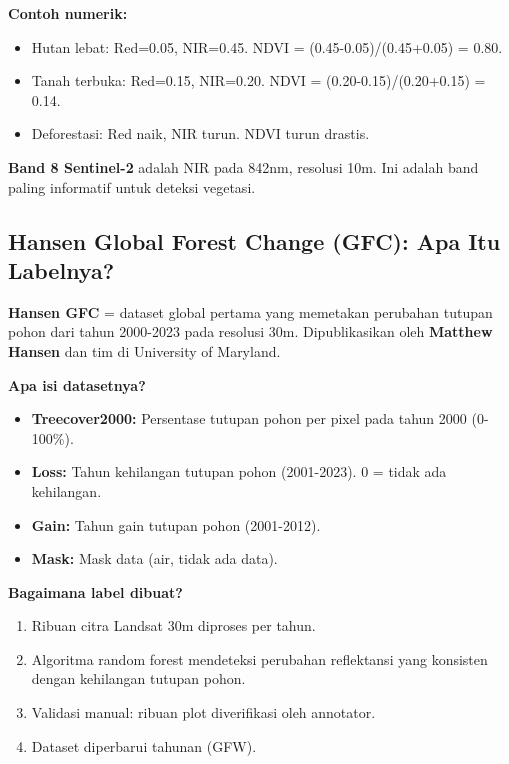 \documentclass[10pt,a4paper,onecolumn]{article}
\begin{document}
\textbf{Contoh numerik:}
\begin{itemize}[nosep]
    \item Hutan lebat: Red=0.05, NIR=0.45. NDVI = (0.45-0.05)/(0.45+0.05) = 0.80.
    \item Tanah terbuka: Red=0.15, NIR=0.20. NDVI = (0.20-0.15)/(0.20+0.15) = 0.14.
    \item Deforestasi: Red naik, NIR turun. NDVI turun drastis.
\end{itemize}

\textbf{Band 8 Sentinel-2} adalah NIR pada 842nm, resolusi 10m.
Ini adalah band paling informatif untuk deteksi vegetasi.

\subsection{Hansen Global Forest Change (GFC): Apa Itu Labelnya?}

\textbf{Hansen GFC} \cite{hansen2013high} = dataset global pertama
yang memetakan perubahan tutupan pohon dari tahun 2000-2023 pada
resolusi 30m. Dipublikasikan oleh \textbf{Matthew Hansen} dan tim
di University of Maryland.

\textbf{Apa isi datasetnya?}
\begin{itemize}[nosep]
    \item \textbf{Treecover2000:} Persentase tutupan pohon per pixel
          pada tahun 2000 (0-100\%).
    \item \textbf{Loss:} Tahun kehilangan tutupan pohon (2001-2023).
          0 = tidak ada kehilangan.
    \item \textbf{Gain:} Tahun gain tutupan pohon (2001-2012).
    \item \textbf{Mask:} Mask data (air, tidak ada data).
\end{itemize}

\textbf{Bagaimana label dibuat?}
\begin{enumerate}[nosep]
    \item Ribuan citra Landsat 30m diproses per tahun.
    \item Algoritma random forest mendeteksi perubahan reflektansi
          yang konsisten dengan kehilangan tutupan pohon.
    \item Validasi manual: ribuan plot diverifikasi oleh annotator.
    \item Dataset diperbarui tahunan (GFW).
\end{enumerate}
\end{document}
